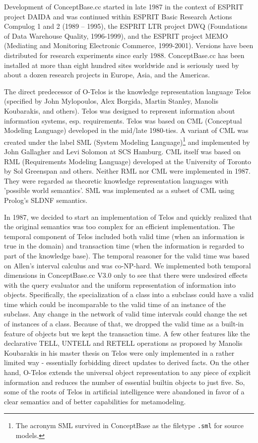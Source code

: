 Development of ConceptBase.cc started in late 1987 in the context of
ESPRIT project DAIDA \cite{JARK93} and was continued within
ESPRIT Basic Research Actions Compulog 1 and 2 (1989 -- 1995), the
ESPRIT LTR project DWQ (Foundations of Data Warehouse Quality, 1996-1999),
and the ESPRIT project MEMO (Mediating and Monitoring Electronic Commerce, 1999-2001).
Versions have been distributed for research experiments since early 1988.
ConceptBase.cc has been installed at more
than eight hundred sites worldwide and is seriously used by about a dozen research projects in
Europe, Asia, and the Americas.

The direct predecessor of O-Telos is the knowledge representation language Telos (specified by 
John Mylopoulos, Alex Borgida, Martin Stanley, Manolis Koubarakis, and others). 
Telos was designed to represent information about information systems, esp. requirements. 
Telos was based on CML (Conceptual Modeling Language) developed in the mid/late 1980-ties. 
A variant of CML was created under the label SML (System Modeling Language)\footnote{
   The acronym SML survived in ConceptBase as the filetype {\tt .sml} for source models.
}
and 
implemented by John Gallagher and Levi Solomon at SCS Hamburg. CML itself was based on 
RML (Requirements Modeling Language) developed at the University of Toronto by Sol Greenspan and others.
Neither RML nor CML were implemented in 1987. They were regarded as theoretic 
knowledge representation languages with 'possible world semantics'. 
SML was implemented as a subset of CML using Prolog's SLDNF semantics. 

In 1987, we decided to start an implementation of Telos and quickly realized that the original semantics 
was too complex for an efficient implementation. The temporal component of Telos included 
both valid time (when an information is true in the domain) and transaction time 
(when the information is regarded to part of the knowledge base). The temporal reasoner for the 
valid time was based on Allen's interval calculus and was co-NP-hard. We implemented both temporal 
dimensions in ConceptBase.cc V3.0 only to see that there were undesired effects with the query evaluator 
and the uniform representation of information into objects. Specifically, the specialization of a 
class into a subclass could have a valid time which could be incomparable to the valid time of an 
instance of the subclass. Any change in the network of valid time intervals could change the 
set of instances of a class. Because of that, we dropped the valid time as a built-in feature of 
objects but we kept the transaction time. A few other features like the declarative TELL, UNTELL 
and RETELL operations as proposed by Manolis Koubarakis in his master thesis on Telos were 
only implemented in a rather limited way - essentially forbidding direct updates to derived facts. 
On the other hand, O-Telos extends the universal object representation to any piece of explicit 
information and reduces the number of essential builtin objects to just five. 
So, some of the roots of Telos in artificial intelligence were abandoned in favor 
of a clear semantics and of better capabilities for metamodeling.

